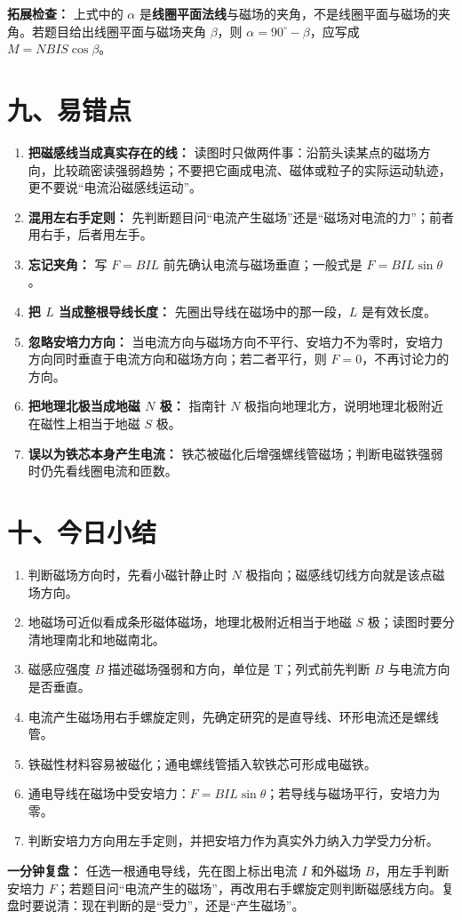 \textbf{拓展检查：} 上式中的 $\alpha$ 是\textbf{线圈平面法线}与磁场的夹角，不是线圈平面与磁场的夹角。若题目给出线圈平面与磁场夹角 $\beta$，则 $\alpha=90^\circ-\beta$，应写成 $M=NBIS\cos\beta$。

\section*{九、易错点}

\begin{mistakebox}
\begin{enumerate}
  \item \textbf{把磁感线当成真实存在的线：} 读图时只做两件事：沿箭头读某点的磁场方向，比较疏密读强弱趋势；不要把它画成电流、磁体或粒子的实际运动轨迹，更不要说“电流沿磁感线运动”。
  \item \textbf{混用左右手定则：} 先判断题目问“电流产生磁场”还是“磁场对电流的力”；前者用右手，后者用左手。
  \item \textbf{忘记夹角：} 写 $F=BIL$ 前先确认电流与磁场垂直；一般式是 $F=BIL\sin\theta$。
  \item \textbf{把 $L$ 当成整根导线长度：} 先圈出导线在磁场中的那一段，$L$ 是有效长度。
  \item \textbf{忽略安培力方向：} 当电流方向与磁场方向不平行、安培力不为零时，安培力方向同时垂直于电流方向和磁场方向；若二者平行，则 $F=0$，不再讨论力的方向。
  \item \textbf{把地理北极当成地磁 $N$ 极：} 指南针 $N$ 极指向地理北方，说明地理北极附近在磁性上相当于地磁 $S$ 极。
  \item \textbf{误以为铁芯本身产生电流：} 铁芯被磁化后增强螺线管磁场；判断电磁铁强弱时仍先看线圈电流和匝数。
\end{enumerate}
\end{mistakebox}

\section*{十、今日小结}

\begin{enumerate}
  \item 判断磁场方向时，先看小磁针静止时 $N$ 极指向；磁感线切线方向就是该点磁场方向。
  \item 地磁场可近似看成条形磁体磁场，地理北极附近相当于地磁 $S$ 极；读图时要分清地理南北和地磁南北。
  \item 磁感应强度 $B$ 描述磁场强弱和方向，单位是 $\mathrm{T}$；列式前先判断 $B$ 与电流方向是否垂直。
  \item 电流产生磁场用右手螺旋定则，先确定研究的是直导线、环形电流还是螺线管。
  \item 铁磁性材料容易被磁化；通电螺线管插入软铁芯可形成电磁铁。
  \item 通电导线在磁场中受安培力：$F=BIL\sin\theta$；若导线与磁场平行，安培力为零。
  \item 判断安培力方向用左手定则，并把安培力作为真实外力纳入力学受力分析。
\end{enumerate}

\textbf{一分钟复盘：} 任选一根通电导线，先在图上标出电流 $I$ 和外磁场 $B$，用左手判断安培力 $F$；若题目问“电流产生的磁场”，再改用右手螺旋定则判断磁感线方向。复盘时要说清：现在判断的是“受力”，还是“产生磁场”。
